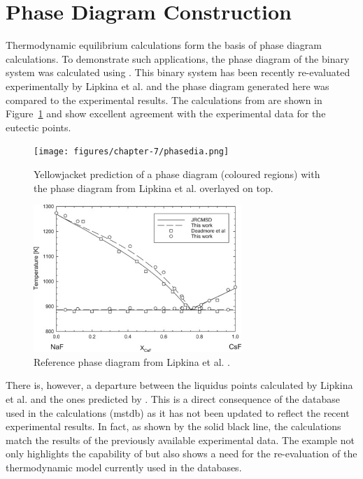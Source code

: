 \section{Phase Diagram Construction}
	Thermodynamic equilibrium calculations form the basis of phase diagram calculations. To demonstrate such applications, the phase diagram of the   binary system was calculated using {\GEM}. This binary system has been recently re-evaluated experimentally by Lipkina et al. \cite{Lipkina:2022aa} and the phase diagram generated here was compared to the experimental results. The calculations from {\GEM} are shown in Figure~\ref{fig:res_phased} and show excellent agreement with the experimental data for the eutectic points.
    \begin{figure}
        \centering
        \texttt{[image: figures/chapter-7/phasedia.png]}
        \caption[Yellowjacket prediction of a  phase diagram.]{Yellowjacket prediction of a  phase diagram (coloured regions) with the phase diagram from Lipkina et al. \cite{Lipkina:2022aa} overlayed on top.}
        \label{fig:res_phased}
    \end{figure}
    \begin{figure}
        \centering
        \includegraphics[width=0.7\textwidth]{figures/chapter-7/pdo.png}
        \caption[Reference  phase  diagram from Lipkina et al.]{Reference  phase  diagram from Lipkina et al. \cite{Lipkina:2022aa}.}
        \label{fig:res_refdia}
    \end{figure}
    There is, however, a departure between the liquidus points calculated by Lipkina et al. and the ones predicted by {\GEM}. This is a direct consequence of the database used in the calculations (\gls{mstdb}) as it has not been updated to reflect the recent experimental results. In fact, as shown by the solid black line, the calculations match the results of the previously available experimental data. The example not only highlights the capability of {\GEM} but also shows a need for the re-evaluation of the  thermodynamic model currently used in the databases.
    

